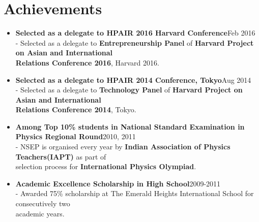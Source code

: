 \documentclass{article}
\begin{document}
\section*{Achievements}
\begin{itemize}

    \item \textbf{Selected as a delegate to HPAIR 2016 Harvard Conference}{\hfill Feb 2016}\\
    - Selected as a delegate to \textbf{Entrepreneurship Panel} of \textbf{Harvard Project on Asian and International\\
    \hspace*{0.7em}Relations Conference 2016}, Harvard 2016.
    
    \item \textbf{Selected as a delegate to HPAIR 2014 Conference, Tokyo}{\hfill Aug 2014}\\
    - Selected as a delegate to \textbf{Technology Panel} of \textbf{Harvard Project on Asian and International\\
    \hspace*{0.7em}Relations Conference 2014}, Tokyo.
    
    \item \textbf{Among Top 10\% students in National Standard Examination in Physics Regional Round}{\hfill 2010, 2011}\\
    - NSEP is organised every year by \textbf{Indian Association of Physics Teachers(IAPT)} as part of\\
    \hspace*{0.7em}selection process for \textbf{International Physics Olympiad}.

    \item \textbf{Academic Excellence Scholarship in High School}{\hfill 2009-2011}\\
    - Awarded 75\% scholarship at The Emerald Heights International School for consecutively two\\
    \hspace*{0.7em}academic years.
    
\end{itemize}
\end{document}
